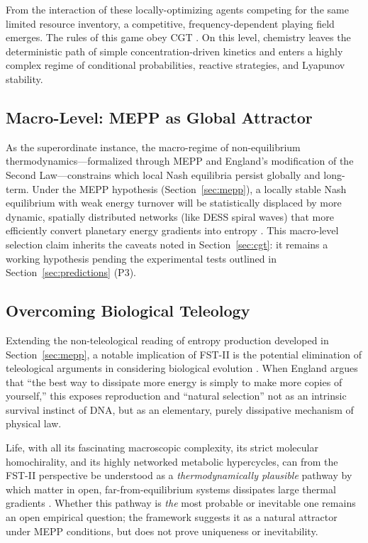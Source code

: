 \documentclass[12pt,a4paper]{article}
\theoremstyle{remark}
\begin{document}
From the interaction of these locally-optimizing agents competing for the same limited resource inventory, a competitive, frequency-dependent playing field emerges. The rules of this game obey CGT \citep{AzoarcusPNAS}. On this level, chemistry leaves the deterministic path of simple concentration-driven kinetics and enters a highly complex regime of conditional probabilities, reactive strategies, and Lyapunov stability.

\subsection{Macro-Level: MEPP as Global Attractor}

As the superordinate instance, the macro-regime of non-equilibrium thermodynamics---formalized through MEPP and England's modification of the Second Law---constrains which local Nash equilibria persist globally and long-term. Under the MEPP hypothesis (Section~\ref{sec:mepp}), a locally stable Nash equilibrium with weak energy turnover will be statistically displaced by more dynamic, spatially distributed networks (like DESS spiral waves) that more efficiently convert planetary energy gradients into entropy \citep{EntropyMEPP}. This macro-level selection claim inherits the caveats noted in Section~\ref{sec:cgt}: it remains a working hypothesis pending the experimental tests outlined in Section~\ref{sec:predictions} (P3).

\subsection{Overcoming Biological Teleology}

Extending the non-teleological reading of entropy production developed in Section~\ref{sec:mepp}, a notable implication of FST-II is the potential elimination of teleological arguments in considering biological evolution \citep{UnbecomingBeing}. When England argues that ``the best way to dissipate more energy is simply to make more copies of yourself,'' this exposes reproduction and ``natural selection'' not as an intrinsic survival instinct of DNA, but as an elementary, purely dissipative mechanism of physical law.

Life, with all its fascinating macroscopic complexity, its strict molecular homochirality, and its highly networked metabolic hypercycles, can from the FST-II perspective be understood as a \emph{thermodynamically plausible} pathway by which matter in open, far-from-equilibrium systems dissipates large thermal gradients \citep{Bioenergetics}. Whether this pathway is \emph{the} most probable or inevitable one remains an open empirical question; the framework suggests it as a natural attractor under MEPP conditions, but does not prove uniqueness or inevitability.
\end{document}
